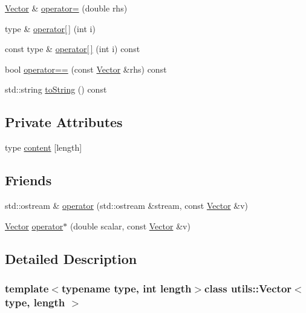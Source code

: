 \begin{DoxyCompactItemize}
\item 
\hyperlink{classutils_1_1Vector}{Vector} \& \hyperlink{classutils_1_1Vector_a5c1cfa1d42abdd9a90b4913892608386}{operator=} (double rhs)
\item 
type \& \hyperlink{classutils_1_1Vector_a391fe7cbc2441879439fbc191ec4ef03}{operator\mbox{[}$\,$\mbox{]}} (int i)
\item 
const type \& \hyperlink{classutils_1_1Vector_a3b965c400abae02fcad3751cf4b79309}{operator\mbox{[}$\,$\mbox{]}} (int i) const 
\item 
bool \hyperlink{classutils_1_1Vector_a04ceba4a8df8a367205d1c57063ec3f8}{operator==} (const \hyperlink{classutils_1_1Vector}{Vector} \&rhs) const 
\item 
std\-::string \hyperlink{classutils_1_1Vector_ab71fcfc3a0e80ee4a7d2c0fc76fed9a0}{to\-String} () const 
\end{DoxyCompactItemize}
\subsection*{Private Attributes}
\begin{DoxyCompactItemize}
\item 
type \hyperlink{classutils_1_1Vector_ab391d67eb8f8563b4dd4b80390a4631a}{content} \mbox{[}length\mbox{]}
\end{DoxyCompactItemize}
\subsection*{Friends}
\begin{DoxyCompactItemize}
\item 
std\-::ostream \& \hyperlink{classutils_1_1Vector_a49b910c983e6c91855b55ab04d401e4f}{operator} (std\-::ostream \&stream, const \hyperlink{classutils_1_1Vector}{Vector} \&v)
\item 
\hyperlink{classutils_1_1Vector}{Vector} \hyperlink{classutils_1_1Vector_a45c43d96a8bbe774870183ff33079584}{operator$\ast$} (double scalar, const \hyperlink{classutils_1_1Vector}{Vector} \&v)
\end{DoxyCompactItemize}


\subsection{Detailed Description}
\subsubsection*{template$<$typename type, int length$>$class utils\-::\-Vector$<$ type, length $>$}


